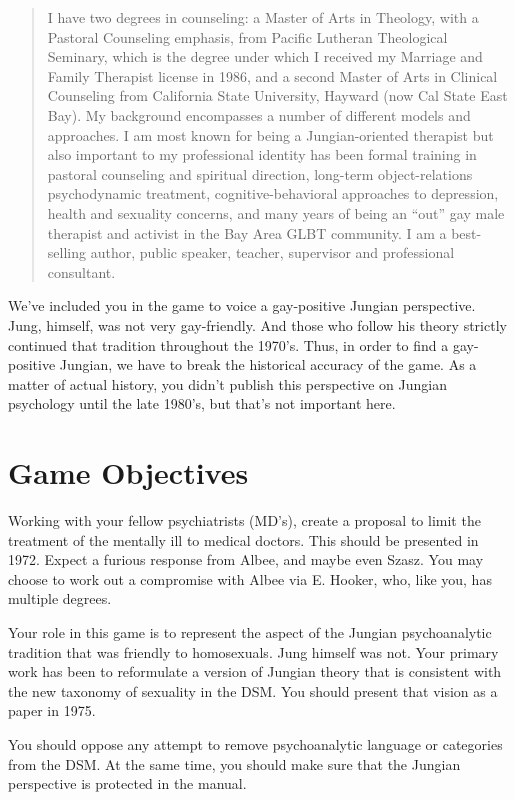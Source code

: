 \begin{quote}

I have two degrees in counseling: a Master of Arts in Theology, with a Pastoral Counseling emphasis, from Pacific Lutheran Theological Seminary, which is the degree under which I received my Marriage and Family Therapist license in 1986, and a second Master of Arts in Clinical Counseling from California State University, Hayward (now Cal State East Bay). My background encompasses a number of different models and approaches. I am most known for being a Jungian-oriented therapist but also important to my professional identity has been formal training in pastoral counseling and spiritual direction, long-term object-relations psychodynamic treatment, cognitive-behavioral approaches to depression, health and sexuality concerns, and many years of being an ``out'' gay male therapist and activist in the Bay Area GLBT community. I am a best-selling author, public speaker, teacher, supervisor and professional consultant.
\end{quote}

We've included you in the game to voice a gay-positive Jungian perspective. Jung, himself, was not very gay-friendly. And those who follow his theory strictly continued that tradition throughout the 1970's. Thus, in order to find a gay-positive Jungian, we have to break the historical accuracy of the game. As a matter of actual history, you didn't publish this perspective on Jungian psychology until the late 1980's, but that's not important here.

\section{Game Objectives}
\label{gameobjectives}

Working with your fellow psychiatrists (MD's), create a proposal to limit the treatment of the mentally ill to medical doctors. This should be presented in 1972. Expect a furious response from Albee, and maybe even Szasz. You may choose to work out a compromise with Albee via E. Hooker, who, like you, has multiple degrees.

Your role in this game is to represent the aspect of the Jungian psychoanalytic tradition that was friendly to homosexuals. Jung himself was not. Your primary work has been to reformulate a version of Jungian theory that is consistent with the new taxonomy of sexuality in the DSM. You should present that vision as a paper in 1975.

You should oppose any attempt to remove psychoanalytic language or categories from the DSM. At the same time, you should make sure that the Jungian perspective is protected in the manual.

